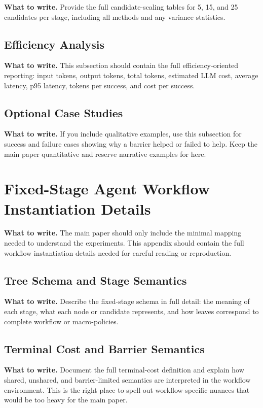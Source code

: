\documentclass{article}
\newcommand{\towrite}[1]{\noindent\textbf{What to write.} #1}
\begin{document}
\towrite{Provide the full candidate-scaling tables for 5, 15, and 25 candidates per stage, including all methods and any variance statistics.}

\subsection{Efficiency Analysis}

\towrite{This subsection should contain the full efficiency-oriented reporting: input tokens, output tokens, total tokens, estimated LLM cost, average latency, p95 latency, tokens per success, and cost per success.}

\subsection{Optional Case Studies}

\towrite{If you include qualitative examples, use this subsection for success and failure cases showing why a barrier helped or failed to help. Keep the main paper quantitative and reserve narrative examples for here.}

\section{Fixed-Stage Agent Workflow Instantiation Details}

\towrite{The main paper should only include the minimal mapping needed to understand the experiments. This appendix should contain the full workflow instantiation details needed for careful reading or reproduction.}

\subsection{Tree Schema and Stage Semantics}

\towrite{Describe the fixed-stage schema in full detail: the meaning of each stage, what each node or candidate represents, and how leaves correspond to complete workflow or macro-policies.}

\subsection{Terminal Cost and Barrier Semantics}

\towrite{Document the full terminal-cost definition and explain how shared, unshared, and barrier-limited semantics are interpreted in the workflow environment. This is the right place to spell out workflow-specific nuances that would be too heavy for the main paper.}
\end{document}
